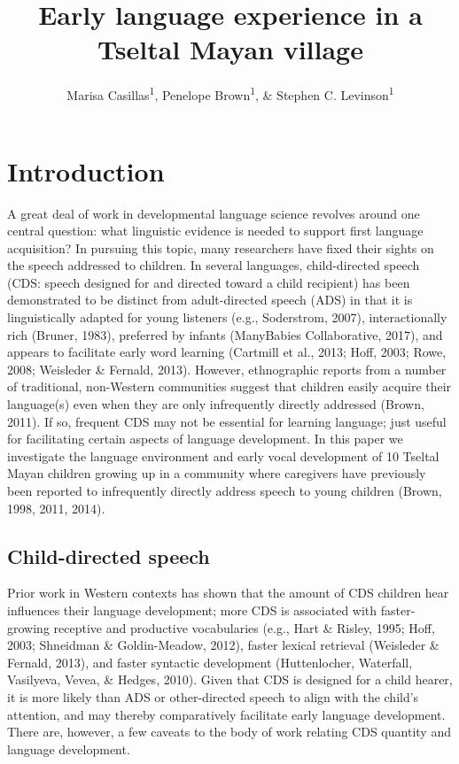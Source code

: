 \documentclass[floatsintext,man]{apa6}
\title{Early language experience in a Tseltal Mayan village}
\author{Marisa Casillas\textsuperscript{1}, Penelope Brown\textsuperscript{1}, \& Stephen C. Levinson\textsuperscript{1}}
\affiliation{
    \vspace{0.5cm}
          \textsuperscript{1} Max Planck Institute for Psycholinguistics  }
\theoremstyle{definition}
\theoremstyle{definition}
\theoremstyle{definition}
\theoremstyle{remark}
\begin{document}
\maketitle

\setcounter{secnumdepth}{0}



\section{Introduction}\label{intro}

A great deal of work in developmental language science revolves around
one central question: what linguistic evidence is needed to support
first language acquisition? In pursuing this topic, many researchers
have fixed their sights on the speech addressed to children. In several
languages, child-directed speech (CDS: speech designed for and directed
toward a child recipient) has been demonstrated to be distinct from
adult-directed speech (ADS) in that it is linguistically adapted for
young listeners (e.g., Soderstrom, 2007), interactionally rich (Bruner,
1983), preferred by infants (ManyBabies Collaborative, 2017), and
appears to facilitate early word learning (Cartmill et al., 2013; Hoff,
2003; Rowe, 2008; Weisleder \& Fernald, 2013). However, ethnographic
reports from a number of traditional, non-Western communities suggest
that children easily acquire their language(s) even when they are only
infrequently directly addressed (Brown, 2011). If so, frequent CDS may
not be essential for learning language; just useful for facilitating
certain aspects of language development. In this paper we investigate
the language environment and early vocal development of 10 Tseltal Mayan
children growing up in a community where caregivers have previously been
reported to infrequently directly address speech to young children
(Brown, 1998, 2011, 2014).

\subsection{Child-directed speech}\label{intro-cds}

Prior work in Western contexts has shown that the amount of CDS children
hear influences their language development; more CDS is associated with
faster-growing receptive and productive vocabularies (e.g., Hart \&
Risley, 1995; Hoff, 2003; Shneidman \& Goldin-Meadow, 2012), faster
lexical retrieval (Weisleder \& Fernald, 2013), and faster syntactic
development (Huttenlocher, Waterfall, Vasilyeva, Vevea, \& Hedges,
2010). Given that CDS is designed for a child hearer, it is more likely
than ADS or other-directed speech to align with the child's attention,
and may thereby comparatively facilitate early language development.
There are, however, a few caveats to the body of work relating CDS
quantity and language development.
\end{document}
